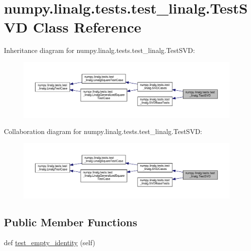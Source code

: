 \hypertarget{classnumpy_1_1linalg_1_1tests_1_1test__linalg_1_1TestSVD}{}\section{numpy.\+linalg.\+tests.\+test\+\_\+linalg.\+Test\+S\+VD Class Reference}
\label{classnumpy_1_1linalg_1_1tests_1_1test__linalg_1_1TestSVD}


Inheritance diagram for numpy.\+linalg.\+tests.\+test\+\_\+linalg.\+Test\+S\+VD\+:
\nopagebreak
\begin{figure}[H]
\begin{center}
\leavevmode
\includegraphics[width=350pt]{classnumpy_1_1linalg_1_1tests_1_1test__linalg_1_1TestSVD__inherit__graph}
\end{center}
\end{figure}


Collaboration diagram for numpy.\+linalg.\+tests.\+test\+\_\+linalg.\+Test\+S\+VD\+:
\nopagebreak
\begin{figure}[H]
\begin{center}
\leavevmode
\includegraphics[width=350pt]{classnumpy_1_1linalg_1_1tests_1_1test__linalg_1_1TestSVD__coll__graph}
\end{center}
\end{figure}
\subsection*{Public Member Functions}
\begin{DoxyCompactItemize}
\item 
def \hyperlink{classnumpy_1_1linalg_1_1tests_1_1test__linalg_1_1TestSVD_a79d09cdfc6fee201188b519851f73568}{test\+\_\+empty\+\_\+identity} (self)
\end{DoxyCompactItemize}
